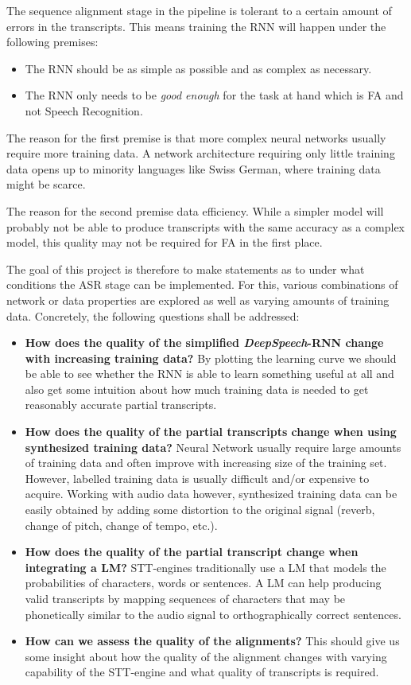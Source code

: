 The sequence alignment stage in the pipeline is tolerant to a certain amount of errors in the transcripts. This means training the \ac{RNN} will happen under the following premises:

\begin{itemize}
	\item The \ac{RNN} should be as simple as possible and as complex as necessary.
	\item The \ac{RNN} only needs to be \textit{good enough} for the task at hand which is \ac{FA} and not Speech Recognition.	
\end{itemize}

The reason for the first premise is that more complex neural networks usually require more training data. A network architecture requiring only little training data opens up to minority languages like Swiss German, where training data might be scarce.

The reason for the second premise data efficiency. While a simpler model will probably not be able to produce transcripts with the same accuracy as a complex model, this quality may not be required for \ac{FA} in the first place. 

The goal of this project is therefore to make statements as to under what conditions the \ac{ASR} stage can be implemented. For this, various combinations of network or data properties are explored as well as varying amounts of training data. Concretely, the following questions shall be addressed:

\begin{itemize}
	\item \textbf{How does the quality of the simplified \textit{DeepSpeech}-\ac{RNN} change with increasing training data?} By plotting the learning curve we should be able to see whether the RNN is able to learn something useful at all and also get some intuition about how much training data is needed to get reasonably accurate partial transcripts.
	\item \textbf{How does the quality of the partial transcripts change when using synthesized training data?} Neural Network usually require large amounts of training data and often improve with increasing size of the training set. However, labelled training data is usually difficult and/or expensive to acquire. Working with audio data however, synthesized training data can be easily obtained by adding some distortion to the original signal (reverb, change of pitch, change of tempo, etc.).
	\item \textbf{How does the quality of the partial transcript change when integrating a \ac{LM}?} \ac{STT}-engines traditionally use a \ac{LM} that models the probabilities of characters, words or sentences. A \ac{LM} can help producing valid transcripts by mapping sequences of characters that may be phonetically similar to the audio signal to orthographically correct sentences.
	\item \textbf{How can we assess the quality of the alignments?} This should give us some insight about how the quality of the alignment changes with varying capability of the \ac{STT}-engine and what quality of transcripts is required.
\end{itemize}


